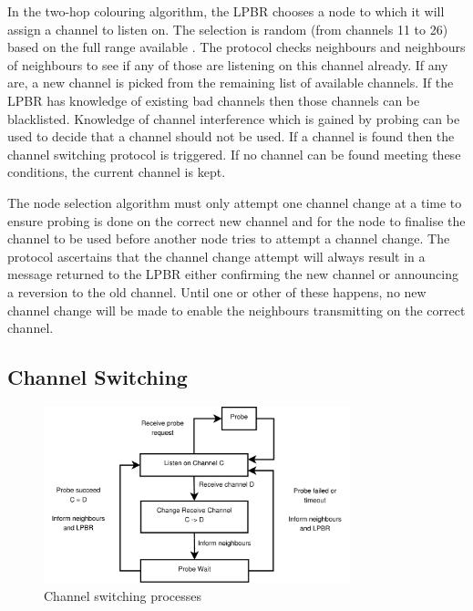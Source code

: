 In the two-hop colouring algorithm, the LPBR chooses a node to which it will assign a channel to listen on. The selection is random (from channels 11 to 26) based on the full range available \cite{ieee802.15.4}. The protocol checks neighbours and neighbours of neighbours to see if any of those are listening on this channel already. If any are, a new channel is picked from the remaining list of available channels. If the LPBR has knowledge of existing bad channels then those channels can be blacklisted.  Knowledge of channel interference which is gained by probing can be used to decide that a channel should not be used. If a channel is found then the channel switching protocol is triggered. If no channel can be found meeting these conditions, the current channel is kept.  

The node selection algorithm must only attempt one channel change at a time to ensure probing is done on the correct new channel and for the node to finalise the channel to be used before another node tries to attempt a channel change.
The protocol ascertains that the channel change attempt will always result in a message returned to the LPBR either confirming the new channel or announcing a reversion to the old channel. Until one or other of these happens, no new channel change will be made to enable the neighbours transmitting on the correct channel.

\subsection{Channel Switching}
\label{sec:channelswitch}

\begin{figure}
\centering
\includegraphics[width=3.5in]{Diagram1.pdf}
\caption{Channel switching processes}
\label{fig_sim}
\end{figure}

